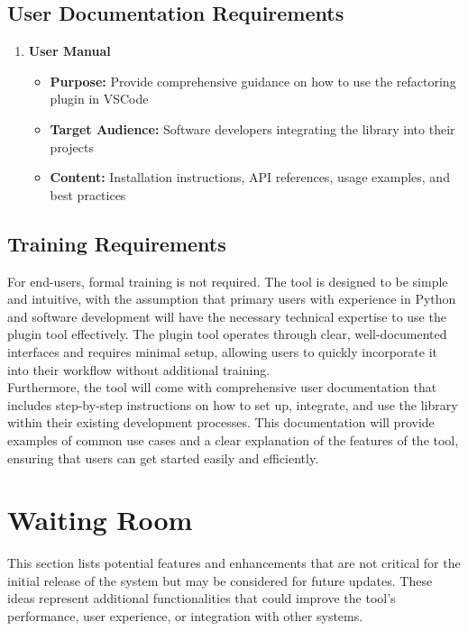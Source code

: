 \documentclass[12pt]{article}
\begin{document}
\subsection{User Documentation Requirements}
\begin{enumerate}
  \item \textbf{User Manual}
    \begin{itemize}
      \item \textbf{Purpose:} Provide comprehensive guidance on how
        to use the refactoring plugin in VSCode
      \item \textbf{Target Audience:} Software developers integrating
        the library into their projects
      \item \textbf{Content:} Installation instructions, API
        references, usage examples, and best practices
    \end{itemize}
\end{enumerate}

\subsection{Training Requirements}
For end-users, formal training is not required. The tool is designed
to be simple and intuitive,
with the assumption that primary users with experience in Python and
software development will
have the necessary technical expertise to use the plugin tool
effectively. The plugin tool
operates through clear, well-documented interfaces and requires
minimal setup, allowing users to
quickly incorporate it into their workflow without additional training.\\

Furthermore, the tool will come with comprehensive user documentation
that includes step-by-step
instructions on how to set up, integrate, and use the library within
their existing development
processes. This documentation will provide examples of common use
cases and a clear explanation of
the features of the tool, ensuring that users can get started easily
and efficiently.

\section{Waiting Room}

This section lists potential features and enhancements that are not
critical for the initial release of the system but may be considered
for future updates. These ideas represent additional functionalities
that could improve the tool’s performance, user experience, or
integration with other systems.
\end{document}
